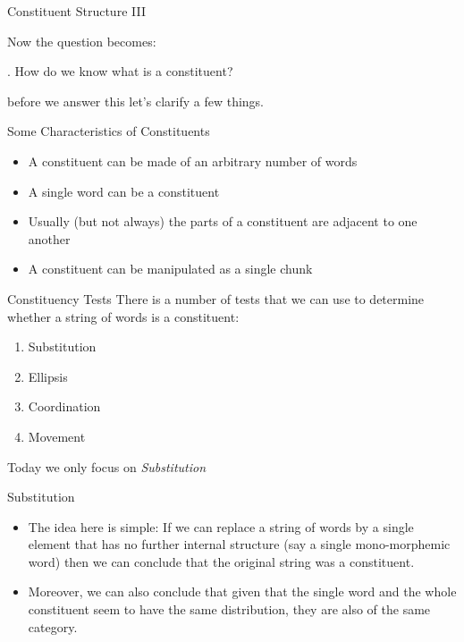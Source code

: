 \begin{frame}
{Constituent Structure III}
  
Now the question becomes:

\ex. How do we know what is a constituent?

before we answer this let's clarify a few things.

\end{frame}

\begin{frame}
  {Some Characteristics of Constituents}

  \begin{itemize}
  \item A constituent can be made of an arbitrary number of words
  \item A single word can be a constituent
  \item Usually (but not always) the parts of a constituent are adjacent to one another
  \item A constituent can be manipulated as a single chunk
  \end{itemize}
\end{frame}

\begin{frame}
  {Constituency Tests}
There is a number of tests that we can use to determine whether a string of words is a constituent:

\begin{enumerate}
\item Substitution
\item Ellipsis
\item Coordination
\item Movement
\end{enumerate}

Today we only focus on \textit{Substitution}

\end{frame}

\begin{frame}
  {Substitution}

\begin{itemize}
\item The idea here is simple:  If we can replace a string of words by a single element that has no further internal structure (say a single mono-morphemic word) then we can conclude that the original string was a constituent.
\item Moreover, we can also conclude that given that the single word and the whole constituent seem to have the same distribution, they are also of the same category.
\end{itemize}

\end{frame}

